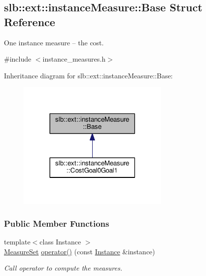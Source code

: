 \hypertarget{structslb_1_1ext_1_1instanceMeasure_1_1Base}{}\subsection{slb\+:\+:ext\+:\+:instance\+Measure\+:\+:Base Struct Reference}
\label{structslb_1_1ext_1_1instanceMeasure_1_1Base}


One instance measure -- the cost.  




{\ttfamily \#include $<$instance\+\_\+measures.\+h$>$}



Inheritance diagram for slb\+:\+:ext\+:\+:instance\+Measure\+:\+:Base\+:\nopagebreak
\begin{figure}[H]
\begin{center}
\leavevmode
\includegraphics[width=209pt]{structslb_1_1ext_1_1instanceMeasure_1_1Base__inherit__graph}
\end{center}
\end{figure}
\subsubsection*{Public Member Functions}
\begin{DoxyCompactItemize}
\item 
{\footnotesize template$<$class Instance $>$ }\\\hyperlink{structslb_1_1core_1_1sb_1_1MeasureSet}{Measure\+Set} \hyperlink{structslb_1_1ext_1_1instanceMeasure_1_1Base_a254c8bb3b0065ee0bceb4f8b456b7cca}{operator()} (const \hyperlink{structslb_1_1core_1_1sb_1_1Instance}{Instance} \&instance)
\begin{DoxyCompactList}\small\item\em Call operator to compute the measures. \end{DoxyCompactList}\end{DoxyCompactItemize}


